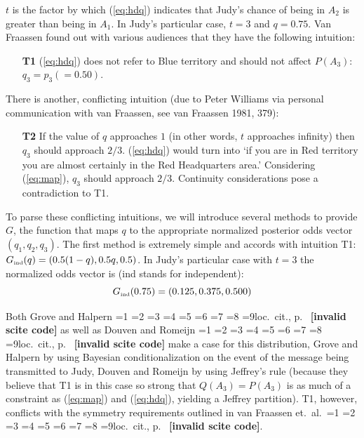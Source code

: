 \documentclass[12pt]{article}
\newcommand{\nonsc}[1]{}
\newcommand{\qnull}[1]{`#1'}
\newif\ifNumericalOrYear
\newcommand{\PageP}{p.~}
\newcommand{\PageP}{}
\newcommand{\nial}{\noindent} %
\newcommand{\scite}[3]{\ifnum#1=1\ifNumericalOrYear\citep{#2}\else\citeyearpar{#2}\fi\else
\ifnum#1=2\ifNumericalOrYear\citep[#3]{#2}\else\citep[{\PageP}#3]{#2}\fi\else
\ifnum#1=3\ifNumericalOrYear(\citet[#3]{#2})\else\citep[{\PageP}#3]{#2}\fi\else
\ifnum#1=4\ifNumericalOrYear\citet{#2}\else\citet{#2}\fi\else
\ifnum#1=5\ifNumericalOrYear(\citet{#2})\else\citep{#2}\fi\else
\ifnum#1=6\ifNumericalOrYear(\citet[#3]{#2})\else\citep[{\PageP}#3]{#2}\fi\else
\ifnum#1=7\ifNumericalOrYear\citep{#2}\else\citealp{#2}\fi\else
\ifnum#1=8\ifNumericalOrYear\citep[#3]{#2}\else\citealp[{\PageP}#3]{#2}\fi\else
\ifnum#1=9\ifNumericalOrYear\citep[#3]{#2}\else{}loc.\ cit., {\PageP}#3\fi\else
\textbf{[invalid scite code]}\fi\fi\fi\fi\fi\fi\fi\fi\fi}
\begin{document}
\nial $t$ is the factor by which ({\ref{eq:hdq}}) indicates that
Judy's chance of being in $A_{2}$ is greater than being in $A_{1}$. In
Judy's particular case, $t=3$ and $q=0.75$. Van Fraassen found out
with various audiences that they have the following intuition:

\begin{enumerate}
  \item[\textbf{T1}] ({\ref{eq:hdq}}) does not refer to Blue territory and
  should not affect $P(A_{3})$: $q_{3}=p_{3}(=0.50)$.
\end{enumerate}

\nial There is another, conflicting intuition (due to Peter Williams
via personal communication with van Fraassen, see van Fraassen 1981,
379)\nonsc{}:

\begin{enumerate}
\item[\textbf{T2}] If the value of $q$ approaches $1$ (in other words,
  $t$ approaches infinity) then $q_{3}$ should approach $2/3$.
  ({\ref{eq:hdq}}) would turn into \qnull{if you are in Red territory
    you are almost certainly in the Red Headquarters area.}
  Considering ({\ref{eq:map}}), $q_{3}$ should approach $2/3$.
  Continuity considerations pose a contradiction to T1.
\end{enumerate}

\nial To parse these conflicting intuitions, we will introduce several
methods to provide $G$, the function that maps $q$ to the appropriate
normalized posterior odds vector $(q_{1},q_{2},q_{3})$. The first
method is extremely simple and accords with intuition T1:
$G_{\mbox{{\tiny ind}}}(q)=(0.5(1-q),0.5q,0.5)$. In Judy's particular
case with $t=3$ the normalized odds vector is (ind stands for
independent):
\begin{displaymath}
  G_{\mbox{{\tiny ind}}}(0.75)=(0.125,0.375,0.500)
\end{displaymath}

\nial Both Grove and Halpern \scite{1}{grovehalpern97}{} as well as
Douven and Romeijn \scite{1}{douvenromeijn09}{} make a case for this
distribution, Grove and Halpern by using Bayesian conditionalization
on the event of the message being transmitted to Judy, Douven and
Romeijn by using Jeffrey's rule (because they believe that T1 is in
this case so strong that $Q(A_{3})=P(A_{3})$ is as much of a
constraint as (\ref{eq:map}) and (\ref{eq:hdq}), yielding a Jeffrey
partition). T1, however, conflicts with the symmetry requirements
outlined in van Fraassen et.\ al.\ \scite{1}{fraassenetal86}{}.
\end{document}
